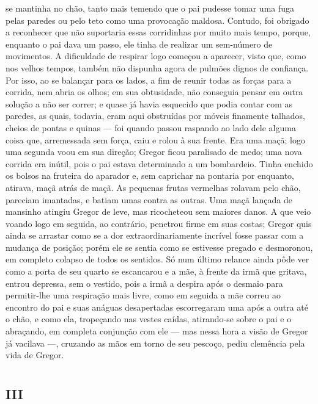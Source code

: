 se mantinha no chão, tanto mais temendo que o pai pudesse tomar uma fuga
pelas paredes ou pelo teto como uma provocação maldosa. Contudo, foi
obrigado a reconhecer que não suportaria essas corridinhas por muito mais
tempo, porque, enquanto o pai dava um passo, ele tinha de realizar um
sem-número de movimentos. A dificuldade de respirar logo começou a
aparecer, visto que, como nos velhos tempos, também não dispunha agora de
pulmões dignos de confiança. Por isso, ao se balançar para os lados, a fim
de reunir todas as forças para a corrida, nem abria os olhos; em sua
obtusidade, não conseguia pensar em outra solução a não ser correr; e
quase já havia esquecido que podia contar com as paredes, as quais,
todavia, eram aqui obstruídas por móveis finamente talhados, cheios de
pontas e quinas --- foi quando passou raspando ao lado dele alguma coisa
que, arremessada sem força, caiu e rolou à sua frente. Era uma maçã; logo
uma segunda voou em sua direção; Gregor ficou paralisado de medo; uma nova
corrida era inútil, pois o pai estava determinado a um bombardeio. Tinha
enchido os bolsos na fruteira do aparador e, sem caprichar na pontaria por
enquanto, atirava, maçã atrás de maçã. As pequenas frutas vermelhas
rolavam pelo chão, pareciam imantadas, e batiam umas contra as outras. Uma
maçã lançada de mansinho atingiu Gregor de leve, mas ricocheteou sem
maiores danos. A que veio voando logo em seguida, ao contrário, penetrou
firme em suas costas; Gregor quis ainda se arrastar como se a dor
extraordinariamente incrível fosse passar com a mudança de posição; porém
ele se sentia como se estivesse pregado e desmoronou, em completo colapso
de todos os sentidos. Só num último relance ainda pôde ver como a porta de
seu quarto se escancarou e a mãe, à frente da irmã que gritava, entrou
depressa, sem o vestido, pois a irmã a despira após o desmaio para
permitir-lhe uma respiração mais livre, como em seguida a mãe correu ao
encontro do pai e suas anáguas desapertadas escorregaram uma após a outra
até o chão, e como ela, tropeçando nas vestes caídas, atirando-se sobre o
pai e o abraçando, em completa conjunção com ele --- mas nessa hora a visão
de Gregor já vacilava ---, cruzando as mãos em torno de seu pescoço, pediu
clemência pela vida de Gregor. 

\chapter*{}
\section{III}

